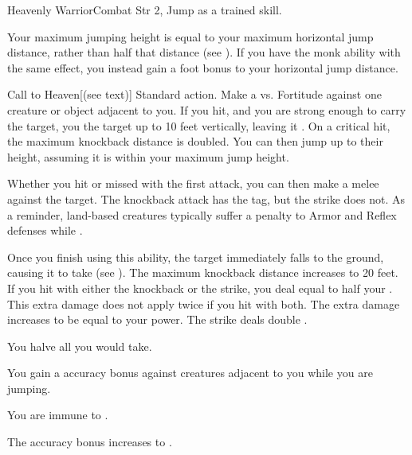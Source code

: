   \begin{feat}{Heavenly Warrior}{Combat}
    \featpre Str 2, Jump as a trained skill.

     Your maximum jumping height is equal to your maximum horizontal jump distance, rather than half that distance (see ).
    If you have the  monk ability with the same effect, you instead gain a  foot bonus to your horizontal jump distance.

    \begin{activeability}{Call to Heaven}[\atBrawling (see text)]
      \abilityusagetime Standard action.
      \rankline
      Make a  vs. Fortitude against one creature or object adjacent to you.
      If you hit, and you are strong enough to carry the target, you  the target up to 10 feet vertically, leaving it .
      On a critical hit, the maximum knockback distance is doubled.
      You can then jump up to their height, assuming it is within your maximum jump height.

      Whether you hit or missed with the first attack, you can then make a melee  against the target.
      The knockback attack has the \atBrawling tag, but the strike does not.
      As a reminder, land-based creatures typically suffer a  penalty to Armor and Reflex defenses while .

      Once you finish using this ability, the target immediately falls to the ground, causing it to take  (see ).
      \rankline
       The maximum knockback distance increases to 20 feet.
       If you hit with either the knockback or the strike, you deal  equal to half your .
      This extra damage does not apply twice if you hit with both.
       The extra damage increases to be equal to your power.
       The strike deals double .
    \end{activeability}

     You halve all  you would take.

     You gain a  accuracy bonus against  creatures adjacent to you while you are jumping.

     You are immune to .

     The accuracy bonus increases to .
  \end{feat}

